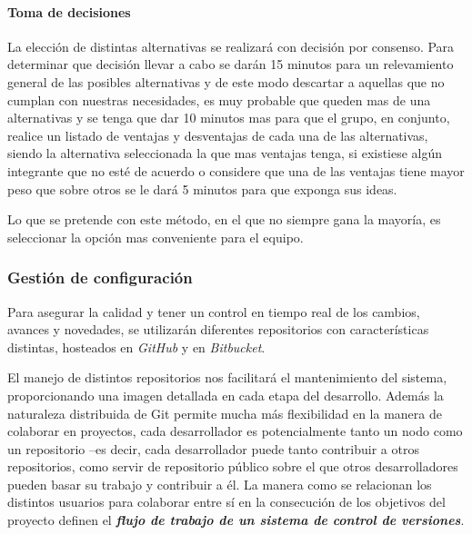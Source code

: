 \paragraph{Toma de decisiones}

La elección de distintas alternativas se realizará con decisión por consenso.
Para determinar que decisión llevar a cabo se darán 15 minutos para un relevamiento general de las posibles alternativas y de este modo descartar a aquellas que no cumplan con nuestras necesidades, es muy probable que queden mas de una alternativas y se tenga que dar 10 minutos mas para que el grupo, en conjunto, realice un listado de ventajas y desventajas de cada una de las alternativas, siendo la alternativa seleccionada la que mas ventajas tenga, si existiese  algún integrante que no esté de acuerdo o considere que una de las ventajas tiene mayor peso que sobre otros se le dará 5 minutos para que exponga sus ideas.

Lo que se pretende con este método, en el que no siempre gana la mayoría, es seleccionar la opción mas conveniente para el equipo.





\subsubsection{Gestión de configuración}

Para asegurar la calidad y tener un control en tiempo real de los cambios, avances y novedades, se utilizarán diferentes repositorios con características distintas, hosteados en \textit{GitHub} y en \textit{Bitbucket}.

El manejo de distintos repositorios nos facilitará el mantenimiento del sistema, proporcionando una imagen detallada en cada etapa del desarrollo. 
Además la naturaleza distribuida de Git permite mucha más flexibilidad en la manera de colaborar en proyectos, cada desarrollador es potencialmente tanto un nodo como un repositorio --es decir, cada desarrollador puede tanto contribuir a otros repositorios, como servir de repositorio público sobre el que otros desarrolladores pueden basar su trabajo y contribuir a él. La manera como se relacionan los distintos usuarios para colaborar entre sí en la consecución de los objetivos del proyecto definen el \textit{\textbf{flujo de trabajo de un sistema de control de versiones}}.
  

